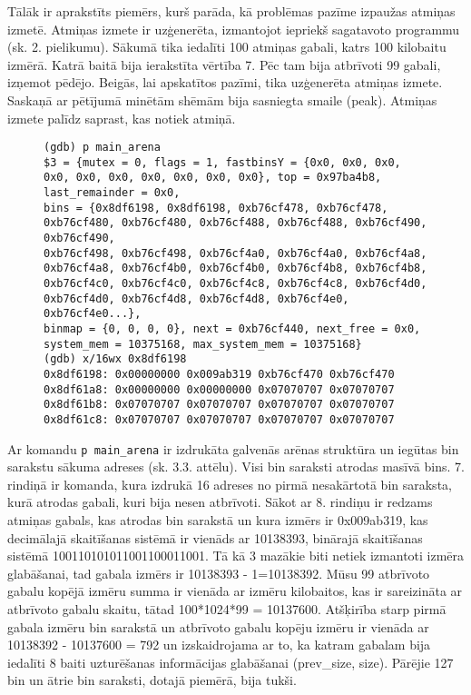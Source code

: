 Tālāk ir aprakstīts piemērs, kurš parāda, kā problēmas pazīme izpaužas atmiņas izmetē.
Atmiņas izmete ir uzģenerēta, izmantojot iepriekš sagatavoto programmu (sk. 2. pielikumu).
Sākumā tika iedalīti 100 atmiņas gabali, katrs 100 kilobaitu izmērā.
Katrā baitā bija ierakstīta vērtība 7.
Pēc tam bija atbrīvoti 99 gabali, izņemot pēdējo.
Beigās, lai apskatītos pazīmi, tika uzģenerēta atmiņas izmete.
Saskaņā ar pētījumā minētām shēmām \cite{PWMS}  bija sasniegta smaile (peak).
Atmiņas izmete palīdz saprast, kas notiek atmiņā.
\begin{figure}[h]
\begin{lstlisting}[style=customgdb]
(gdb) p main_arena
$3 = {mutex = 0, flags = 1, fastbinsY = {0x0, 0x0, 0x0, 0x0, 0x0, 0x0, 0x0, 0x0, 0x0, 0x0}, top = 0x97ba4b8, last_remainder = 0x0,
bins = {0x8df6198, 0x8df6198, 0xb76cf478, 0xb76cf478, 0xb76cf480, 0xb76cf480, 0xb76cf488, 0xb76cf488, 0xb76cf490, 0xb76cf490,
0xb76cf498, 0xb76cf498, 0xb76cf4a0, 0xb76cf4a0, 0xb76cf4a8, 0xb76cf4a8, 0xb76cf4b0, 0xb76cf4b0, 0xb76cf4b8, 0xb76cf4b8,
0xb76cf4c0, 0xb76cf4c0, 0xb76cf4c8, 0xb76cf4c8, 0xb76cf4d0, 0xb76cf4d0, 0xb76cf4d8, 0xb76cf4d8, 0xb76cf4e0, 0xb76cf4e0...},
binmap = {0, 0, 0, 0}, next = 0xb76cf440, next_free = 0x0, system_mem = 10375168, max_system_mem = 10375168}
(gdb) x/16wx 0x8df6198
0x8df6198: 0x00000000 0x009ab319 0xb76cf470 0xb76cf470
0x8df61a8: 0x00000000 0x00000000 0x07070707 0x07070707
0x8df61b8: 0x07070707 0x07070707 0x07070707 0x07070707
0x8df61c8: 0x07070707 0x07070707 0x07070707 0x07070707
\end{lstlisting}
\caption{\textbf{\fontsize{11}{12}\selectfont {bin saraksta izdruka, izmantojot atmiņas izmeti}}}
\end{figure}
Ar komandu \texttt{p main\_arena} ir izdrukāta galvenās arēnas struktūra un iegūtas bin sarakstu sākuma adreses (sk. 3.3. attēlu).
Visi bin saraksti atrodas masīvā bins.
7. rindiņā ir komanda, kura izdrukā 16 adreses no pirmā nesakārtotā bin saraksta, kurā atrodas gabali, kuri bija nesen atbrīvoti.
Sākot ar 8. rindiņu ir redzams atmiņas gabals, kas atrodas bin sarakstā un kura izmērs ir 0x009ab319, kas decimālajā skaitīšanas sistēmā ir vienāds ar 10138393, binārajā skaitīšanas sistēmā 100110101011001100011001.
Tā kā 3 mazākie biti netiek izmantoti izmēra glabāšanai, tad gabala izmērs ir 10138393 - 1=10138392.
Mūsu 99 atbrīvoto gabalu kopējā izmēru summa ir vienāda ar izmēru kilobaitos, kas ir sareizināta ar atbrīvoto gabalu skaitu, tātad 100*1024*99 = 10137600.
Atšķirība starp pirmā gabala izmēru bin sarakstā un atbrīvoto gabalu kopēju izmēru ir vienāda ar 10138392 - 10137600 = 792 un izskaidrojama ar to, ka katram gabalam bija iedalīti 8 baiti uzturēšanas informācijas glabāšanai (prev\_size, size).
Pārējie 127 bin un ātrie bin saraksti, dotajā piemērā, bija tukši.


